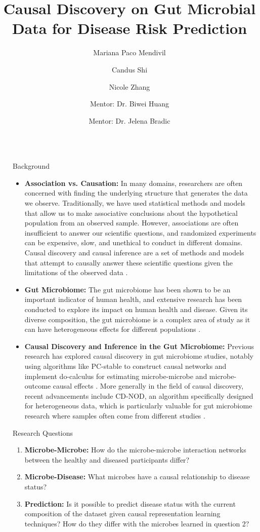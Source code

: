 \documentclass[final]{beamer}
\title{\centering Causal Discovery on Gut Microbial Data for Disease Risk Prediction}
\author{Mariana Paco Mendivil \inst{1} \and Candus Shi \inst{2} \and Nicole Zhang \inst{3} \and Mentor: Dr. Biwei Huang \inst{4} \and Mentor: Dr. Jelena Bradic \inst{5}}
\institute[shortinst]{\inst{1} mpacomendivil@ucsd.edu \samelineand \inst{2} c6shi@ucsd.edu \samelineand \inst{3} nwzhang@ucsd.edu \samelineand \inst{4} bih007@ucsd.edu \samelineand \inst{5} jbradic@ucsd.edu}
\newlength{\sepwidth}
\newlength{\colwidth}
\newcommand{\separatorcolumn}{\begin{column}{\sepwidth}\end{column}}
\begin{document}
\begin{frame}[t]
\begin{columns}[t]
\separatorcolumn

\begin{column}{\colwidth}

  \begin{block}{Background}
    \begin{itemize}
      \item \textbf{Association vs. Causation:} In many domains, researchers are often concerned with finding the underlying structure that generates the data we observe. Traditionally, we have used statistical methods and models that allow us to make associative conclusions about the hypothetical population from an observed sample. However, associations are often insufficient to answer our scientific questions, and randomized experiments can be expensive, slow, and unethical to conduct in different domains. Causal discovery and causal inference are a set of methods and models that attempt to causally answer these scientific questions given the limitations of the observed data \cite{pearl2016primer}.
      \item \textbf{Gut Microbiome:} The gut microbiome has been shown to be an important indicator of human health, and extensive research has been conducted to explore its impact on human health and disease. Given its diverse composition, the gut microbiome is a complex area of study as it can have heterogeneous effects for different populations \cite{baars2024gutt2d}. 
      \item \textbf{Causal Discovery and Inference in the Gut Microbiome:} Previous research has explored causal discovery in gut microbiome studies, notably using algorithms like PC-stable to construct causal networks and implement do-calculus for estimating microbe-microbe and microbe-outcome causal effects \cite{sazal2021causalgut}. More generally in the field of causal discovery, recent advancements include CD-NOD, an algorithm specifically designed for heterogeneous data, which is particularly valuable for gut microbiome research where samples often come from different studies \cite{huang2019cdnod}. 
    \end{itemize}

  \end{block}

  \begin{block}{Research Questions}

    \begin{enumerate}
      \item \textbf{Microbe-Microbe:} How do the microbe-microbe interaction networks between the healthy and diseased participants differ?
      \item \textbf{Microbe-Disease:} What microbes have a causal relationship to disease status?
      \item \textbf{Prediction:} Is it possible to predict disease status with the current composition of the dataset given causal representation learning techniques? How do they differ with the microbes learned in question 2?
    \end{enumerate}
  \end{block}


\end{column}
\end{columns}
\end{frame}
\end{document}
